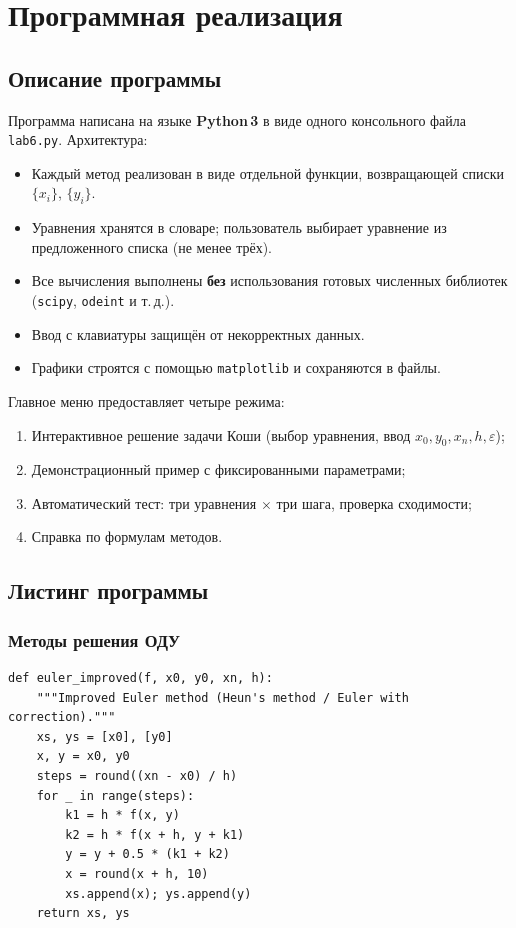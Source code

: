 \documentclass[a4paper,12pt]{article}
\begin{document}
\section{Программная реализация}

\subsection{Описание программы}

Программа написана на языке \textbf{Python\,3} в виде одного консольного файла
\texttt{lab6.py}. Архитектура:

\begin{itemize}
    \item Каждый метод реализован в виде отдельной функции, возвращающей списки $\{x_i\}$, $\{y_i\}$.
    \item Уравнения хранятся в словаре; пользователь выбирает уравнение из предложенного списка (не менее трёх).
    \item Все вычисления выполнены \textbf{без} использования готовых численных библиотек (\texttt{scipy}, \texttt{odeint} и т.\,д.).
    \item Ввод с клавиатуры защищён от некорректных данных.
    \item Графики строятся с помощью \texttt{matplotlib} и сохраняются в файлы.
\end{itemize}

Главное меню предоставляет четыре режима:
\begin{enumerate}
    \item Интерактивное решение задачи Коши (выбор уравнения, ввод $x_0, y_0, x_n, h, \varepsilon$);
    \item Демонстрационный пример с фиксированными параметрами;
    \item Автоматический тест: три уравнения $\times$ три шага, проверка сходимости;
    \item Справка по формулам методов.
\end{enumerate}

\subsection{Листинг программы}

\subsubsection{Методы решения ОДУ}

\begin{lstlisting}[style=intellij, caption={Усовершенствованный метод Эйлера (метод Хойна)}]
def euler_improved(f, x0, y0, xn, h):
    """Improved Euler method (Heun's method / Euler with correction)."""
    xs, ys = [x0], [y0]
    x, y = x0, y0
    steps = round((xn - x0) / h)
    for _ in range(steps):
        k1 = h * f(x, y)
        k2 = h * f(x + h, y + k1)
        y = y + 0.5 * (k1 + k2)
        x = round(x + h, 10)
        xs.append(x); ys.append(y)
    return xs, ys
\end{lstlisting}
\end{document}
